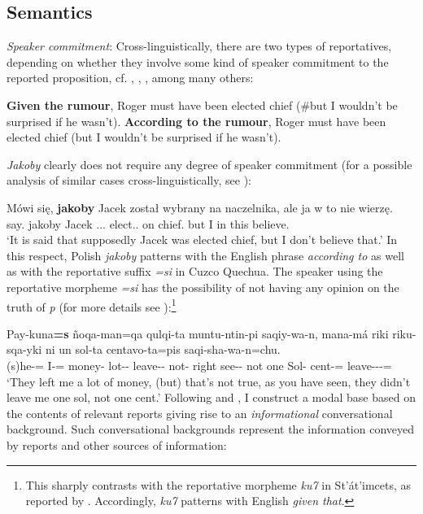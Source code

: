 \documentclass[output=paper
,modfonts
,nonflat]{langsci/langscibook}
\begin{document}
\subsection{Semantics}

\emph{Speaker commitment}: Cross-linguistically, there are two types of reportatives, depending on whether they involve some kind of speaker commitment to the reported proposition, cf. \textcite{Faller2011}, \textcite{Kratzer2012}, \textcite{Murray2017}, among many others:

\ea	\ea	\textbf{Given the rumour}, Roger must have been elected chief (\#but I wouldn't be surprised if he wasn't).
	\ex	\textbf{According to the rumour}, Roger must have been elected chief (but I wouldn't be surprised if he wasn't). 
\z\z

\noindent \emph{Jakoby} clearly does not require any degree of speaker commitment (for a possible analysis of similar cases cross-linguistically, see \textcite{AnderBois2014}):

\ea \gll Mówi się, \textbf{jakoby} Jacek został wybrany na naczelnika, ale ja w to nie wierzę. \\
		say.{\thirdperson}{\sg} {} jakoby Jacek  {\passaux}.{\lptcp}.{\sg}.{\masc} elect.{\ptcp}.{\masc} on chief.{\acc} but I in this {\negation} believe.{\firstperson}{\sg} \\
\glt	`It is said that supposedly Jacek was elected chief, but I don't believe that.' 
\z
In this respect, Polish \emph{jakoby} patterns with the English phrase \emph{according to} as well as with the reportative suffix \emph{=si} in Cuzco Quechua. The speaker using the reportative morpheme \emph{=si} has the possibility of not having any opinion on the truth of \emph{p} (for more details see \textcite{Faller2011}):\footnote{
This sharply contrasts with the reportative morpheme \emph{ku7} in St'át'imcets, as reported by \textcite{Lisa-Matthewson-Davis2017}. Accordingly, \emph{ku7} patterns with English \emph{given that}.  
}

\ea \gll Pay-kuna\textbf{=s} ñoqa-man=qa qulqi-ta muntu-ntin-pi saqiy-wa-n, mana-má riki riku-sqa-yki ni un sol-ta centavo-ta=pis saqi-sha-wa-n=chu. \\
		(s)he-{\pl}={\rep} I-{\illa}={\topi} money-{\acc} lot-{\incl}-{\loc} leave-{\firstperson}{\object}-{\thirdperson} not-{\impr} right see-{\ptcp}-{\secondperson} not one Sol-{\acc} cent-{\acc}={\add} leave-{\prog}-{\firstperson}{\object}-{\thirdperson}={\negation} \\
\glt	 `They left me a lot of money, (but) that's not true, as you have seen, they didn't leave me one sol, not one cent.' 
\z
Following \textcite{Kratzer2012} and \textcite{Faller2011}, I construct a modal base based on the contents of relevant reports giving rise to an \emph{informational} conversational background. Such conversational backgrounds represent the information conveyed by reports and other sources of information:
\end{document}
